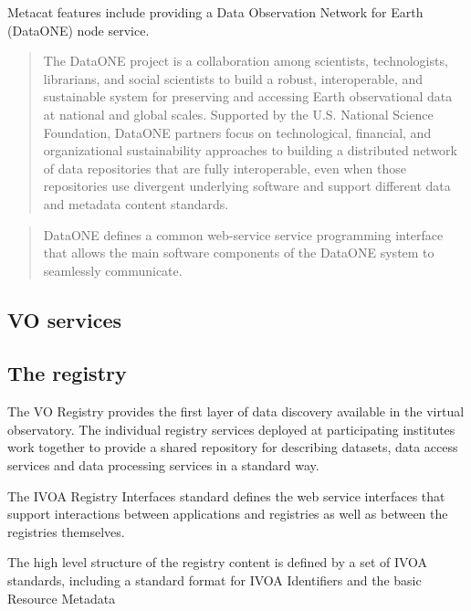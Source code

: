 \documentclass{article}
\begin{document}
Metacat features include providing a Data Observation Network for Earth (DataONE)
node service.
 
\begin{quote}
The DataONE project is a collaboration among scientists, technologists,
librarians, and social scientists to build a robust, interoperable, and
sustainable system for preserving and accessing Earth observational data at
national and global scales. Supported by the U.S. National Science Foundation,
DataONE partners focus on technological, financial, and organizational
sustainability approaches to building a distributed network of data repositories
that are fully interoperable, even when those repositories use divergent
underlying software and support different data and metadata content standards.
\end{quote}
\begin{quote}
DataONE defines a common web-service service programming interface that allows
the main software components of the DataONE system to seamlessly communicate.
\end{quote}








\subsection{VO services}

\subsection{The registry}

The VO Registry provides the first layer of data discovery available in the
virtual observatory. The individual registry services deployed at participating
institutes work together to provide a shared repository for describing datasets,
data access services and data processing services in a standard way.

The IVOA Registry Interfaces standard
defines the web service interfaces that support interactions between
applications and registries as well as between the registries themselves.

The high level structure of the registry content is defined by a
set of IVOA standards, including a standard format for IVOA Identifiers
and the basic Resource Metadata
\end{document}
